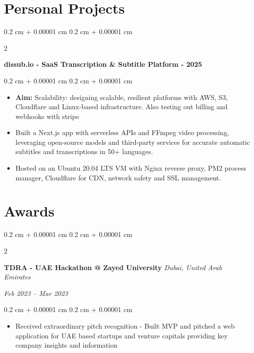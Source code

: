 \documentclass[10pt, letterpaper]{article}
\newenvironment{highlights}{
    \begin{itemize}[
        topsep=0.10 cm,
        parsep=0.10 cm,
        partopsep=0pt,
        itemsep=0pt,
        leftmargin=0.4 cm + 10pt
    ]
}{
    \end{itemize}
} %
\newenvironment{onecolentry}{
    \begin{adjustwidth}{
        0.2 cm + 0.00001 cm
    }{
        0.2 cm + 0.00001 cm
    }
}{
    \end{adjustwidth}
} %
\newenvironment{twocolentry}[2][]{
    \onecolentry
    \def\secondColumn{#2}
    \setcolumnwidth{\fill, 4.5 cm}
    \begin{paracol}{2}
}{
    \switchcolumn \raggedleft \secondColumn
    \end{paracol}
    \endonecolentry
} %
\let\hrefWithoutArrow\href
\renewcommand{\href}[2]{\hrefWithoutArrow{#1}{\ifthenelse{\equal{#2}{}}{ }{#2 }\raisebox{.15ex}{\footnotesize \faExternalLink*}}}
\begin{document}
            \section{ Personal Projects}
    \begin{twocolentry}{
      \textit{\href{https://dissub.io}{dissub.io}}}
      \textbf{dissub.io - SaaS Transcription \& Subtitle Platform - 2025}
    \end{twocolentry}
    \vspace{0.10 cm}
        \begin{onecolentry}
          \begin{highlights}
            \item {\color{primaryColor}\textbf{Aim:} Scalability: designing scalable, resilient platforms with AWS, S3, Cloudflare and Linux-based infrastructure. Also testing out billing and webhooks with stripe }
            \item Built a Next.js app with serverless APIs and FFmpeg video processing, leveraging open-source models and third-party services for accurate automatic subtitles and transcriptions in 50+ languages. 
            \item Hosted on an Ubuntu 20.04 LTS VM with Nginx reverse proxy, PM2 process manager, Cloudflare for CDN, network safety and SSL management.
          \end{highlights}
        \end{onecolentry}

        \section{ Awards}
    \begin{twocolentry}{
        \textit{Feb 2023 – Mar 2023}}
        \textbf{TDRA - UAE Hackathon @ Zayed University}
        \textit{Dubai, United Arab Emirates}
    \end{twocolentry}
    \vspace{0.10 cm}
    \begin{onecolentry}
        \begin{highlights}
            \item Received extraordinary pitch recognition - Built MVP and pitched a web application for UAE based startups and venture capitals providing key company insights and information
        \end{highlights}
    \end{onecolentry}
        \vspace{0.2 cm}
\end{document}
